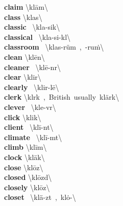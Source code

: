 \documentclass[10pt,a4paper]{article}
\begin{document}
\begin{multicols}{2}
\textbf{ claim }\quad \textbackslash \textprimstress kl\={a}m\textbackslash \\
\textbf{ class }\quad \textbackslash \textprimstress klas\textbackslash \\
\textbf{ classic }\quad \ \textbackslash \textprimstress kla-sik\textbackslash \\
\textbf{ classical }\quad \ \textbackslash \textprimstress kla-si-k\textschwa l\textbackslash \\
\textbf{ classroom }\quad \ \textbackslash \textprimstress klas-\textsecstress r\"{u}m\ ,\ -\textsecstress ru\. m\textbackslash \\
\textbf{ clean }\quad \textbackslash \textprimstress kl\={e}n\textbackslash \\
\textbf{ cleaner }\quad \ \textbackslash \textprimstress kl\={e}-n\textschwa r\textbackslash \\
\textbf{ clear }\quad \textbackslash \textprimstress klir\textbackslash \\
\textbf{ clearly }\quad \ \textbackslash \textprimstress klir-l\={e}\textbackslash \\
\textbf{ clerk }\quad \textbackslash \textprimstress kl\textschwa rk\ ,\ British\ usually\ \textprimstress kl\"{a}rk\textbackslash \\
\textbf{ clever }\quad \ \textbackslash \textprimstress kle-v\textschwa r\textbackslash \\
\textbf{ click }\quad \textbackslash \textprimstress klik\textbackslash \\
\textbf{ client }\quad \ \textbackslash \textprimstress kl\={i}-\textschwa nt\textbackslash \\
\textbf{ climate }\quad \ \textbackslash \textprimstress kl\={i}-m\textschwa t\textbackslash \\
\textbf{ climb }\quad \textbackslash \textprimstress kl\={i}m\textbackslash \\
\textbf{ clock }\quad \textbackslash \textprimstress kl\"{a}k\textbackslash \\
\textbf{ close }\quad \textbackslash \textprimstress kl\={o}z\textbackslash \\
\textbf{ closed }\quad \textbackslash \textprimstress kl\={o}zd\textbackslash \\
\textbf{ closely }\quad \textbackslash \textprimstress kl\={o}z\textbackslash \\
\textbf{ closet }\quad \ \textbackslash \textprimstress kl\"{a}-z\textschwa t\ ,\ \textprimstress kl\.{o}-\textbackslash \\

\end{multicols}
\end{document}
